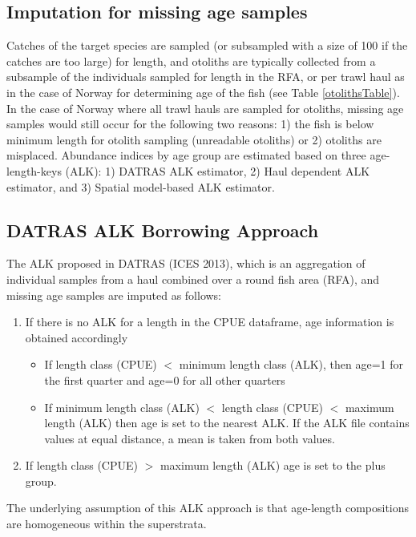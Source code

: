 \documentclass[a4paper 12pt]{article}
\numberwithin{equation}{section}
\begin{document}
\begin{appendices}
\section{Imputation for missing age samples}
\label{sec:imputationappendix}
Catches of the target species are sampled (or subsampled with a size of 100 if the catches are too large) for length, and otoliths are typically collected from a subsample of the individuals sampled for length in the RFA,  or per trawl haul as in the case of Norway for determining age of the fish (see Table \ref{otolithsTable}). In the case of Norway where all trawl hauls are sampled for otoliths, missing age samples would still occur for the following two reasons: 1) the fish is below minimum length for otolith sampling (unreadable otoliths) or 2) otoliths are misplaced. Abundance indices by age group are estimated based on three age-length-keys (ALK): 1) DATRAS ALK estimator, 2) Haul dependent ALK estimator, and 3) Spatial model-based ALK estimator.
\subsection{DATRAS ALK Borrowing Approach}
\label{secAp:DATRASBorrow}
The ALK proposed in DATRAS (ICES 2013), which is an aggregation of individual samples from a haul combined over a round fish area (RFA), and missing age samples are imputed as follows: 
\begin{enumerate}
\item If there is no ALK for a length in the CPUE dataframe, age information is obtained accordingly
\begin{itemize}
\item If length class (CPUE) $<$ minimum length class (ALK), then age=1 for the first quarter and age=0 for all other quarters
\item  If minimum length class (ALK) $<$ length class (CPUE) $<$ maximum length (ALK) then age is set to the nearest ALK. If the ALK file contains values at equal distance, a mean is taken from both values. 
\end{itemize}
\item If length class (CPUE) $>$ maximum length (ALK) age is set to the plus group.
\end{enumerate}
The underlying assumption of this ALK approach is that age-length compositions are homogeneous within the superstrata. 

\end{appendices}
\end{document}
